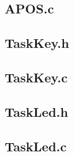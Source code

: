 \documentclass[12pt,naustrian,a4widepaper]{scrartcl}
\begin{document}
 \subsection{APOS.c}
 
 \subsection{TaskKey.h}
 
 \subsection{TaskKey.c}
 
 \subsection{TaskLed.h}
 
 \subsection{TaskLed.c}
 
\end{document}
